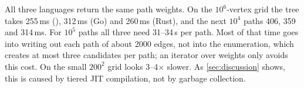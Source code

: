All three languages return the same path weights. On the $10^6$-vertex grid the tree takes 255\,ms (\cs), 312\,ms (Go)
and 260\,ms (Rust), and the next $10^4$ paths 406, 359 and 314\,ms. For $10^5$ paths all three need 31--34\,\textmu s
per path. Most of that time goes into writing out each path of about 2000 edges, not into the enumeration, which
creates at most three candidates per path; an iterator over weights only avoids this cost. On the small $200^2$
grid \cs{} looks 3--4$\times$ slower. As \cref{sec:discussion} shows, this is caused by tiered JIT compilation, not
by garbage collection.
